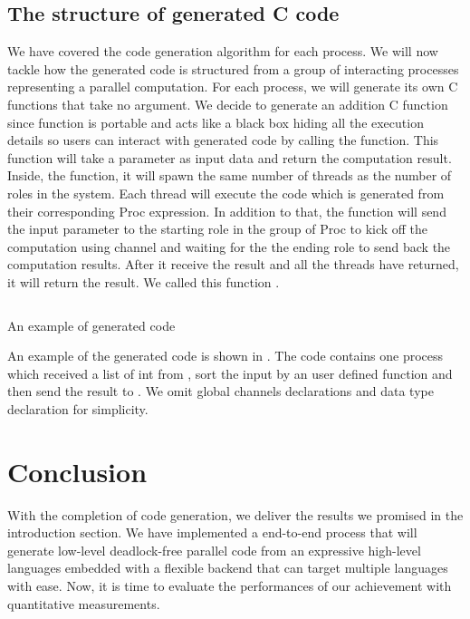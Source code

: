 \subsection{The structure of generated C code}
We have covered the code generation algorithm for each process. We will now tackle how the generated code is structured from a group of interacting processes representing a parallel computation. For each process, we will generate its own C functions that take no argument. We decide to generate an addition C function since function is portable and acts like a black box hiding all the execution details so users can interact with generated code by calling the function. This function will take a parameter as input data and return the computation result. Inside, the function, it will spawn the same number of threads as the number of roles in the system. Each thread will execute the code which is generated from their corresponding Proc expression. In addition to that, the function will send the input parameter to the starting role in the group of Proc to kick off the computation using channel and waiting for the the ending role to send back the computation results. After it receive the result and all the threads have returned, it will return the result. We called this function .
\begin{listing}
    \inputminted{C}{codegen/total.c} 
    \caption{An example of generated code}
    \label{codegen:code:total}
\end{listing}

An example of the generated code is shown in . The code contains one process which received a list of int from , sort the input by an user defined function and then send the result to . We omit global channels declarations and data type declaration for simplicity. 

\section{Conclusion}
With the completion of code generation, we deliver the results we promised in the introduction section. We have implemented a end-to-end process that will generate low-level deadlock-free parallel code from an expressive high-level languages embedded with a flexible backend that can target multiple languages with ease. Now, it is time to evaluate the performances of our achievement with quantitative measurements.
